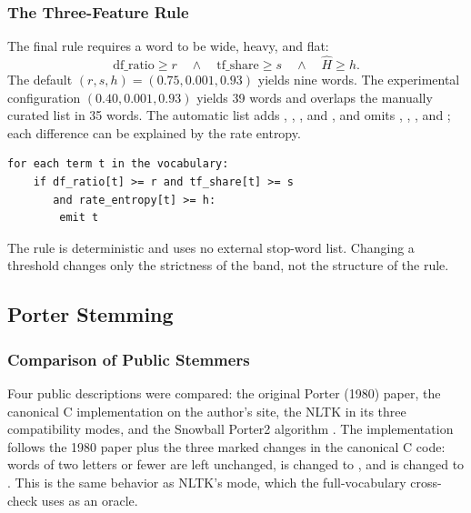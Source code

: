 \subsubsection{The Three-Feature Rule}

The final rule requires a word to be wide, heavy, and flat:
\begin{equation}
  \mathrm{df\_ratio}\ge r
  \quad\land\quad
  \mathrm{tf\_share}\ge s
  \quad\land\quad
  \widehat H\ge h.
\end{equation}
The default $(r,s,h)=(0.75,0.001,0.93)$ yields nine words. The experimental
configuration $(0.40,0.001,0.93)$ yields 39 words and overlaps the manually
curated list in 35 words. The automatic list adds , ,
, and , and omits , , ,
and ; each difference can be explained by the rate entropy.

\begin{lstlisting}[style=cli]
for each term t in the vocabulary:
    if df_ratio[t] >= r and tf_share[t] >= s
       and rate_entropy[t] >= h:
        emit t
\end{lstlisting}

The rule is deterministic and uses no external stop-word list. Changing a
threshold changes only the strictness of the band, not the structure of the
rule.

\subsection{Porter Stemming}
\label{sec:stemmer}

\subsubsection{Comparison of Public Stemmers}

Four public descriptions were compared: the original Porter (1980) paper, the
canonical C implementation on the author's site, the NLTK
 in its three compatibility modes, and the Snowball Porter2
algorithm \cite{porter1980,porter-c,nltk,snowball}. The implementation follows
the 1980 paper plus the three marked  changes in the
canonical C code: words of two letters or fewer are left unchanged, 
is changed to , and  is changed to . This is the
same behavior as NLTK's  mode, which the full-vocabulary
cross-check uses as an oracle.

